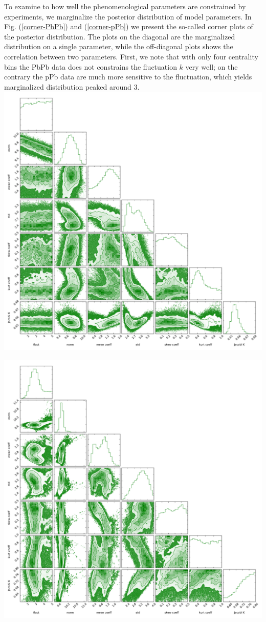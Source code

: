 \documentclass[aps,prl,twocolumn,groupedaddress]{revtex4-1}
\begin{document}
	To examine to how well the phenomenological parameters are constrained by experiments, we marginalize the posterior distribution of model parameters. 
	In Fig. (\ref{corner-PbPb}) and (\ref{corner-pPb}) we present the so-called corner plots of the posterior distribution. 
	The plots on the diagonal are the marginalized distribution on a single parameter, while the off-diagonal plots shows the correlation between two parameters. 
	First, we note that with only four centrality bins the PbPb data does not constrains the fluctuation $k$ very well; on the contrary the pPb data are much more sensitive to the fluctuation, which yields marginalized distribution peaked around 3.
	\includegraphics[width=\columnwidth]{pics/corner-PbPb.pdf}
	
	\includegraphics[width=\columnwidth]{pics/corner-pPb.pdf}
\end{document}
